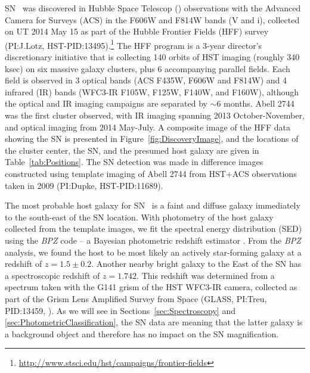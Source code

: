 SN \tomas\ was discovered in Hubble Space Telescop (\HST) observations
with the Advanced Camera for Surveys (ACS) in the F606W and F814W
bands (V and i), collected on UT 2014 May 15 as part of the Hubble
Frontier Fields (HFF) survey (PI:J.Lotz,
HST-PID:13495).\footnote{\url{http://www.stsci.edu/hst/campaigns/frontier-fields}}
The HFF program is a 3-year director's discretionary initiative that
is collecting 140 orbits of HST imaging (roughly 340 ksec) on six
massive galaxy clusters, plus 6 accompanying parallel fields.  Each
field is observed in 3 optical bands (ACS F435W, F606W and F814W) and
4 infrared (IR) bands (WFC3-IR F105W, F125W, F140W, and F160W),
although the optical and IR imaging campaigns are separated by $\sim$6
months. Abell 2744 was the first cluster observed, with IR imaging
spanning 2013 October-November, and optical imaging from 2014
May-July.  A composite image of the HFF data showing the SN is
presented in Figure~\ref{fig:DiscoveryImage}, and the
locations of the cluster center, the SN, and the presumed host galaxy
are given in Table~\ref{tab:Positions}.  The SN detection was made in
difference images constructed using template imaging of Abell 2744
from HST+ACS observations taken in 2009 (PI:Dupke, HST-PID:11689).






The most probable host galaxy for SN \tomas\ is a faint and diffuse
galaxy immediately to the south-east of the SN location.  With
photometry of the host galaxy collected from the template images, we
fit the spectral energy distribution (SED) using the {\it BPZ} code --
a Bayesian photometric redshift estimator \citep{Benitez:2000}. 
From the {\it BPZ} analysis, we found the host to be most likely an
actively star-forming galaxy at a redshift of
$z=1.5\pm0.2$.    Another nearby bright galaxy to the East of the SN has a
spectroscopic redshift of $z=1.742$.  This redshift was determined
from a spectrum taken with the G141 grism of the HST WFC3-IR camera,
collected as part of the Grism Lens Amplified Survey from Space
(GLASS, PI:Treu, PID:13459, \citealt{Treu:2015}). As we will see in
Sections~\ref{sec:Spectroscopy}
and \ref{sec:PhotometricClassification}, the SN data are  meaning that the latter galaxy is a background object and
therefore has no impact on the SN magnification.

